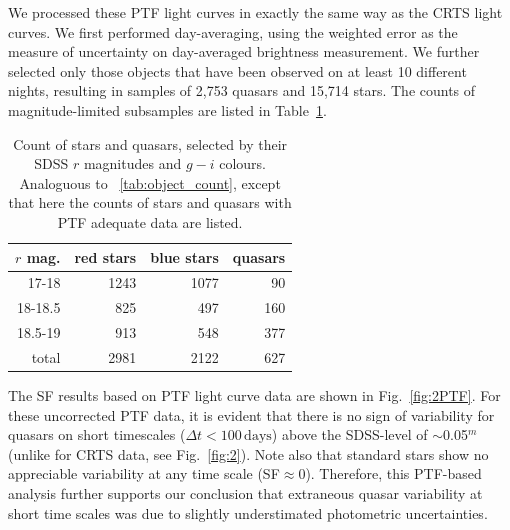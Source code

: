 \documentclass[fleqn,usenatbib]{mnras}
\begin{document}
We processed these PTF light curves in exactly the same way as the CRTS light curves. We first performed day-averaging, 
using the weighted error as the measure of uncertainty on day-averaged brightness measurement. We further selected only 
those objects that have been observed on at least 10 different nights, resulting in samples of 2,753 quasars and 15,714 stars. 
The counts of magnitude-limited subsamples are listed in Table~\ref{tab:ptf}. 

\begin{table}
\centering
\caption{Count of stars and quasars, selected by their SDSS $r$ magnitudes and $g-i$ colours. Analoguous to ~\ref{tab:object_count}, except that here the counts of stars and quasars with PTF
adequate data are listed.}
\label{tab:ptf}
\begin{tabular}{ r|rrr } 
\hline
$r$ mag.  & red stars & blue stars & quasars \\ 
\hline
17-18   & 1243 & 1077   & 90    \\ 
18-18.5 & 825 &  497  & 160   \\ 
18.5-19 & 913 &  548  & 377   \\
\hline
total       & 2981 &  2122 & 627  
\end{tabular}
\end{table}
 
The SF results based on PTF light curve data are shown in Fig.~\ref{fig:2PTF}.  For these uncorrected PTF data, 
it is evident that there is no sign of variability for quasars on short timescales ($\Delta t < 100 \, \mathrm{days}$) 
above the SDSS-level of $\sim$0.05$^m$ (unlike for CRTS data, see Fig.~\ref{fig:2}). Note also that standard stars 
show no appreciable variability at any time scale (SF$\approx0$). Therefore, this PTF-based analysis further 
supports our conclusion that extraneous quasar variability at short time scales was due to slightly understimated
photometric uncertainties. 
\end{document}
